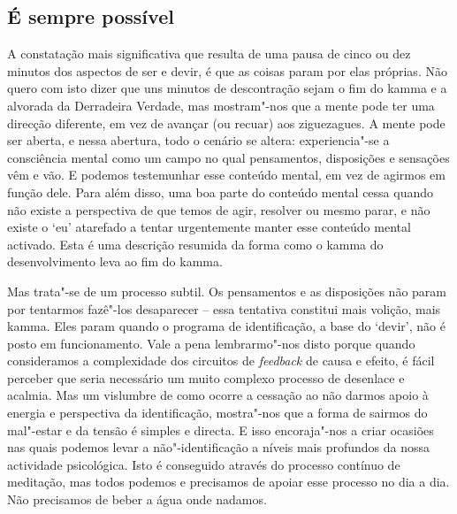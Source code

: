 \subsection{É sempre possível}

A constatação mais significativa que resulta de uma pausa de cinco ou dez
minutos dos aspectos de ser e devir, é que as coisas param por elas próprias.
Não quero com isto dizer que uns minutos de descontração sejam o fim do kamma e
a alvorada da Derradeira Verdade, mas mostram"-nos que a mente pode ter uma
direcção diferente, em vez de avançar (ou recuar) aos ziguezagues. A mente pode
ser aberta, e nessa abertura, todo o cenário se altera: experiencia"-se a
consciência mental como um campo no qual pensamentos, disposições e sensações
vêm e vão. E podemos testemunhar esse conteúdo mental, em vez de agirmos em
função dele. Para além disso, uma boa parte do conteúdo mental cessa quando não
existe a perspectiva de que temos de agir, resolver ou mesmo parar, e não existe
o `eu' atarefado a tentar urgentemente manter esse conteúdo mental
activado.
Esta é uma descrição resumida da forma como o kamma do desenvolvimento leva ao
fim do kamma.

Mas trata"-se de um processo subtil. Os pensamentos e as disposições não param
por tentarmos fazê"-los desaparecer -- essa tentativa constitui mais volição,
mais kamma. Eles param quando o programa de identificação, a base do `devir',
não é posto em funcionamento. Vale a pena lembrarmo"-nos disto porque quando
consideramos a complexidade dos circuitos de \emph{feedback} de causa e efeito,
é fácil perceber que seria necessário um muito complexo processo de desenlace e
acalmia. Mas um vislumbre de como ocorre a cessação ao não darmos apoio à
energia e perspectiva da identificação, mostra"-nos que a forma de sairmos do
mal"-estar e da tensão é simples e directa. E isso encoraja"-nos a criar ocasiões
nas quais podemos levar a não"-identificação a níveis mais profundos da nossa
actividade psicológica. Isto é conseguido através do processo contínuo de
meditação, mas todos podemos e precisamos de apoiar esse processo no dia a dia.
Não precisamos de beber a água onde nadamos.

